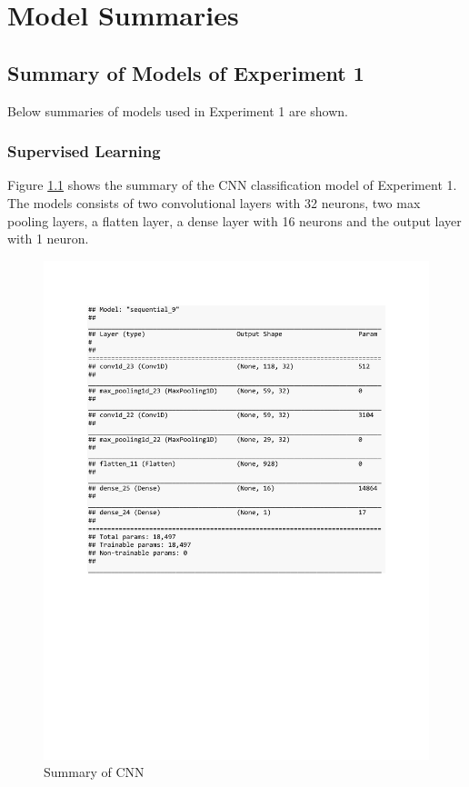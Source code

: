 
\chapter{Model Summaries} %

\label{AppendixA} %

\section{Summary of Models of Experiment 1}

Below summaries of models used in Experiment 1 are shown.

\subsection{Supervised Learning}

Figure \ref{fig:summary_CNN_class_syn} shows the summary of the CNN classification model of Experiment 1. The models consists of two convolutional layers with 32 neurons, two max pooling layers, a flatten layer, a dense layer with 16 neurons and the output layer with 1 neuron. 
\begin{figure}[h]
	\centering
	\includegraphics[scale=0.45]{Figures/summary_CNN_class_syn}
	\decoRule
	\caption[Experiment 1: Summary of CNN for supervised learning]{Summary of CNN \parencite{own}}
	\label{fig:summary_CNN_class_syn}
\end{figure}

